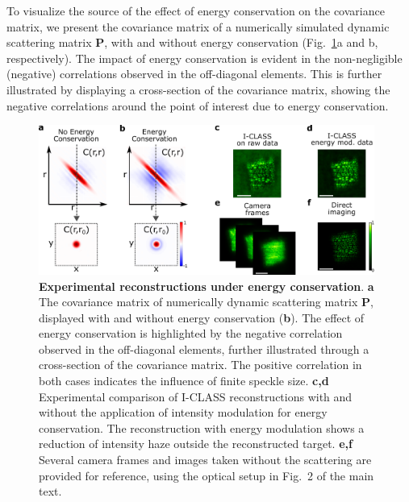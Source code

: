 \documentclass[pdflatex,sn-mathphys-num,Numbered]{sn-jnl}%
\theoremstyle{thmstyleone}%
\theoremstyle{thmstyletwo}%
\theoremstyle{thmstylethree}%
\begin{document}
To visualize the source of the effect of energy conservation on the covariance matrix, we present the covariance matrix of a numerically simulated dynamic scattering matrix \textbf{P}, with and without energy conservation (Fig.~\ref{figS2}a and b, respectively). The impact of energy conservation is evident in the non-negligible (negative) correlations observed in the off-diagonal elements. This is further illustrated by displaying a cross-section of the covariance matrix, showing the negative correlations around the point of interest due to energy conservation. 

\pagebreak

\begin{figure}[htb!]
	\centering
	\includegraphics [width=0.98\textwidth,]
	{supp_figures/figure_S2.pdf}
         \renewcommand{\thefigure}{S3}

    \caption{\textbf{Experimental reconstructions under energy conservation}. \textbf{a} The covariance matrix of numerically dynamic scattering matrix \textbf{P}, displayed with and without energy conservation (\textbf{b}). The effect of energy conservation is highlighted by the negative correlation observed in the off-diagonal elements, further illustrated through a cross-section of the covariance matrix. The positive correlation in both cases indicates the influence of finite speckle size. 
    \textbf{c,d} Experimental comparison of I-CLASS reconstructions with and without the application of intensity modulation for energy conservation. The reconstruction with energy modulation shows a reduction of intensity haze outside the reconstructed target. \textbf{e,f} Several camera frames and images taken without the scattering are provided for reference, using the optical setup in Fig.~2 of the main text.}
        \label{figS2}
\end{figure} 
\end{document}
